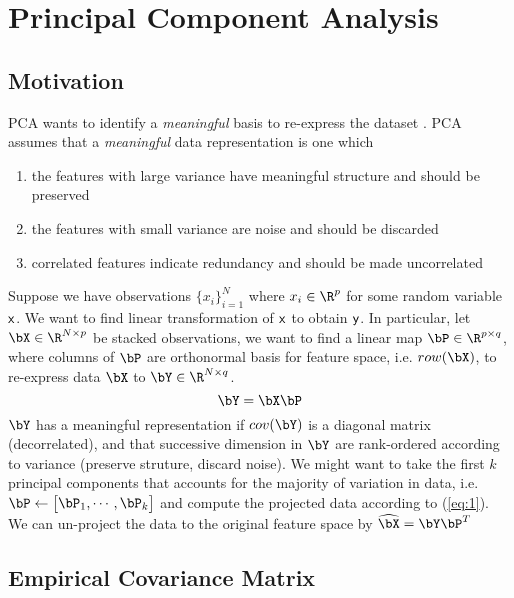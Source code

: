 \documentclass[11pt]{article}
\begin{document}
\section{Principal Component Analysis}

\subsection{Motivation} 

PCA wants to identify a \textit{meaningful} basis to re-express the dataset \cite{shlensTutorialPrincipalComponent2014}. PCA assumes that a \textit{meaningful} data representation is one which 
\begin{enumerate}
    \item the features with large variance have meaningful structure and should be preserved
    \item the features with small variance are noise and should be discarded
    \item correlated features indicate redundancy and should be made uncorrelated
\end{enumerate}
Suppose we have observations $\{x_i\}_{i=1}^N$ where $x_i\in \R^p$ for some random variable $\mathsf{x}$. We want to find linear transformation of $\mathsf{x}$ to obtain $\mathsf{y}$. In particular, let $\bX \in \R^{N\times p}$ be stacked observations, we want to find a linear map $\bP \in \R^{p\times q}$, where columns of $\bP$ are orthonormal basis for feature space, i.e. $row(\bX)$, to re-express data $\bX$ to $\bY \in \R^{N\times q}$.
\begin{equation}
    \label{eq:1}
    \bY = \bX \bP
\end{equation}
$\bY$ has a meaningful representation if $cov(\bY)$ is a diagonal matrix (decorrelated), and that successive dimension in $\bY$ are rank-ordered according to variance (preserve struture, discard noise). We might want to take the first $k$ principal components that accounts for the majority of variation in data, i.e. $\bP \leftarrow \begin{bmatrix} \bP_1,\cdots,\bP_k \end{bmatrix}$ and compute the projected data according to (\ref{eq:1}). We can un-project the data to the original feature space by $\widehat{\bX} = \bY\bP^T$

\subsection{Empirical Covariance Matrix}
\end{document}

